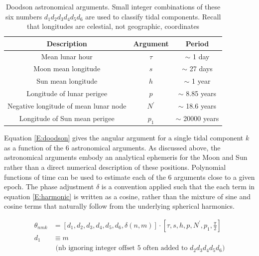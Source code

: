 \begin{table}[htp]
\caption{Doodson astronomical arguments.  Small integer combinations of these six numbers $d_1 d_2 d_3 d_4 d_5 d_6$ are used to classify tidal components.  Recall that longitudes are celestial, not geographic, coordinates}
\begin{center} 
\begin{tabular}{|c|c|c|}
\hline
Description                            & Argument          & Period\\
\hline
Mean lunar hour                        & $\tau$            & $\sim$ 1 day      \\
Moon mean longitude                    & $s$               & $\sim$ 27 days    \\  
Sun mean longitude                     & $h$               & $\sim$ 1 year     \\
Longitude of lunar perigee             & $p$               & $\sim$ 8.85 years \\
Negative longitude of mean lunar node  & $N^\prime$        & $\sim$ 18.6 years \\
Longitude of Sun mean perigee          & $p_1$             & $\sim$ 20000 years\\
\hline
\end{tabular} 
\end{center}
\label{T:doodson}
\end{table}


Equation \ref{E:doodson} gives the angular argument for a single tidal component $k$ as a function of the 6 astronomical arguments.   As discussed above, the astronomical arguments embody an analytical ephemeris for the Moon and Sun rather than a direct numerical description of these positions.  Polynomial functions of time can be used to estimate each of the 6 arguments close to a given epoch.  The phase adjustment $\delta$ is a convention applied such that the each term in equation \ref{E:harmonic} is written as a cosine, rather than the mixture of sine and cosine terms that naturally follow from the underlying spherical harmonics.

\begin{align}
\label{E:doodson}
\theta_{nmk}  &= \left[ d_1 , d_2 , d_3 , d_4 , d_5 ,d_6 , \delta(n,m)  \right] \cdot \left[ \tau , s  , h , p , N^\prime , p_1 , \frac{\pi}{2}   \right]   \\
          d_1 &\equiv m \nonumber \\
              & \mbox{ (nb ignoring integer offset 5 often added to $d_2d_3d_4d_5d_6$)} \nonumber
\end{align}

